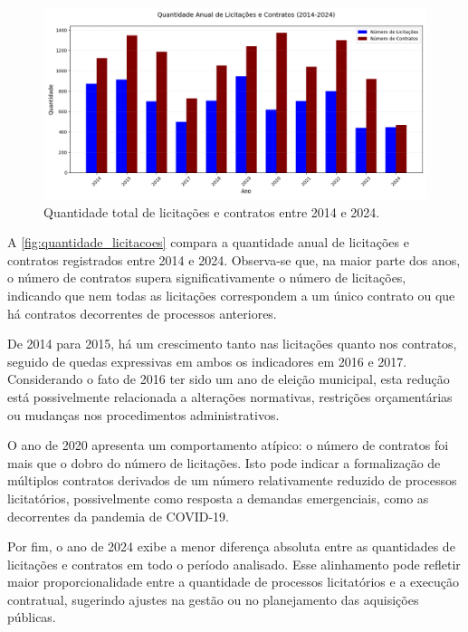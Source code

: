 \documentclass[
	12pt,				%
	oneside,			%
	a4paper,			%
	chapter=TITLE,		%
	section=TITLE,		%
	english,			%
	brazil				%
	]{abntex2}
\begin{document}
\begin{figure}[h]
	\begin{center}
		\caption{\label{fig:quantidade_licitacoes}Quantidade total de licitações e contratos entre 2014 e 2024.}
		\includegraphics[scale=0.41,trim={0 0 0 2cm},clip]{images/quantidade_anual.png} %
	\end{center}
\end{figure}

A \autoref{fig:quantidade_licitacoes} compara a quantidade anual de licitações e contratos registrados entre 2014 e 2024. Observa-se que, na maior parte dos anos, o número de contratos supera significativamente o número de licitações, indicando que nem todas as licitações correspondem a um único contrato ou que há contratos decorrentes de processos anteriores.

De 2014 para 2015, há um crescimento tanto nas licitações quanto nos contratos, seguido de quedas expressivas em ambos os indicadores em 2016 e 2017. Considerando o fato de 2016 ter sido um ano de eleição municipal, esta redução está possivelmente relacionada a alterações normativas, restrições orçamentárias ou mudanças nos procedimentos administrativos.

O ano de 2020 apresenta um comportamento atípico: o número de contratos foi mais que o dobro do número de licitações. Isto pode indicar a formalização de múltiplos contratos derivados de um número relativamente reduzido de processos licitatórios, possivelmente como resposta a demandas emergenciais, como as decorrentes da pandemia de COVID-19.

Por fim, o ano de 2024 exibe a menor diferença absoluta entre as quantidades de licitações e contratos em todo o período analisado. Esse alinhamento pode refletir maior proporcionalidade entre a quantidade de processos licitatórios e a execução contratual, sugerindo ajustes na gestão ou no planejamento das aquisições públicas.
\end{document}
